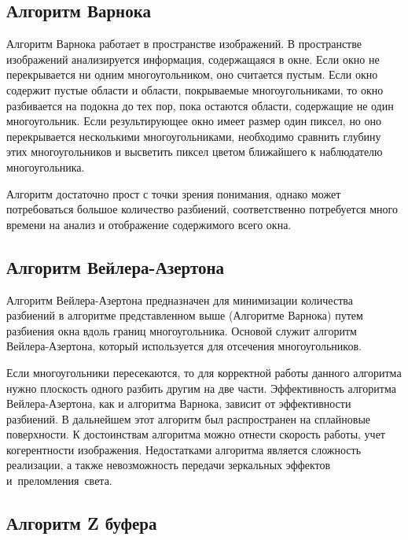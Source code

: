 \subsection{Алгоритм Варнока}

Алгоритм Варнока работает в пространстве изображений. В пространстве изображений анализируется информация, содержащаяся в окне. Если окно не перекрывается ни одним многоугольником, оно считается пустым. Если окно содержит пустые области и области, покрываемые многоугольниками, то окно разбивается на подокна до тех пор, пока остаются области, содержащие не один многоугольник. Если результирующее окно имеет размер один пиксел, но оно перекрывается несколькими многоугольниками, необходимо сравнить глубину этих многоугольников и высветить пиксел цветом ближайшего к наблюдателю многоугольника.
\begin{figure}[ht!]
\end{figure}


Алгоритм достаточно прост с точки зрения понимания, однако может потребоваться большое количество разбиений, соответственно потребуется много времени на анализ и отображение содержимого всего окна.

\subsection{Алгоритм Вейлера-Азертона}

Алгоритм Вейлера-Азертона предназначен для минимизации количества разбиений в алгоритме представленном выше (Алгоритме Варнока) путем разбиения окна вдоль границ многоугольника. Основой служит алгоритм Вейлера-Азертона, который используется для отсечения многоугольников.

Если многоугольники пересекаются, то для корректной работы данного алгоритма нужно плоскость одного разбить другим на две части. Эффективность алгоритма Вейлера-Азертона, как и алгоритма Варнока, зависит от эффективности разбиений. В дальнейшем этот алгоритм был распространен на сплайновые поверхности. К достоинствам алгоритма можно отнести скорость работы, учет когерентности изображения. Недостатками алгоритма является сложность реализации, а также невозможность передачи зеркальных эффектов и преломления света.
\subsection{Алгоритм Z буфера}


